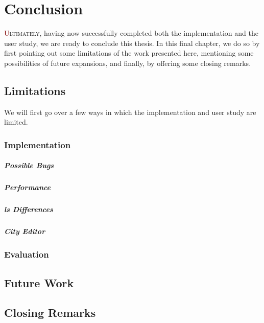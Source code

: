 \documentclass[../thesis]{subfiles}
\begin{document}
\chapter{Conclusion}\label{ch:conclusion}

\lettrine[lines=3]{\textcolor{Maroon}{U}}{ltimately}, having now successfully completed both the implementation and the user study, we are ready to conclude this thesis.
In this final chapter, we do so by first pointing out some limitations of the work presented here, mentioning some possibilities of future expansions, and finally, by offering some closing remarks.

\section{Limitations}
We will first go over a few ways in which the implementation and user study are limited.

\subsection{Implementation}

\paragraph{Possible Bugs}
\fxfatal{}

\paragraph{Performance}
\fxfatal{}

\paragraph{\Gls{ls} Differences}
\fxfatal{}

\paragraph{City Editor}
\fxfatal{}

\subsection{Evaluation}
\fxfatal{}

\section{Future Work}
\fxfatal{}


\section{Closing Remarks}
\fxfatal{}
\end{document}
